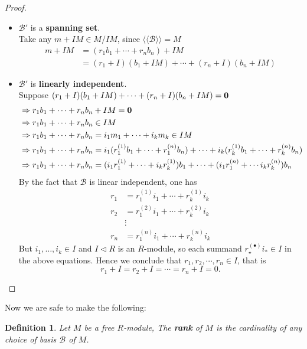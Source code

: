 \documentclass[12pt]{amsbook}
\newtheorem{definition}[theorem]{Definition}
\begin{document}
\begin{proof}
\bigskip
    \begin{itemize}
        \item $\mathcal{B}'$ is a {\bf spanning set}. \\
         Take any $m+IM\in M/IM$, since $\langle\langle\mathcal{B}\rangle\rangle = M$
            \begin{align*}
                m+IM&=(r_1b_1+\cdots+r_nb_n)+IM \\
                    &=(r_1+I)(b_1+IM)+\cdots+(r_n+I)(b_n+IM)
            \end{align*}
        \item $\mathcal{B}'$ is {\bf linearly independent}.\\
         Suppose $(r_1+I)(b_1+IM)+\cdots+(r_n+I)(b_n+IM)= {\bf 0}$
        \begin{align*}
            & \Rightarrow r_1b_1+\cdots+r_nb_n+IM={\bf 0} \\
            & \Rightarrow r_1b_1+\cdots+r_nb_n \in IM \\
            & \Rightarrow r_1b_1+\cdots+r_nb_n=i_1m_1+\cdots+i_km_k\in IM \\
            & \Rightarrow r_1b_1+\cdots+r_nb_n=i_1(r_1^{(1)}b_1+\cdots+r_1^{(n)}b_n)+\cdots +i_k(r_k^{(1)}b_1+\cdots+r_k^{(n)}b_n) \\
            & \Rightarrow r_1b_1+\cdots+r_nb_n=(i_1r_1^{(1)}+\cdots+i_kr_k^{(1)})b_1+\cdots+(i_1r_1^{(n)}+\cdots i_kr_k^{(n)})b_n
        \end{align*}
        By the fact that $\mathcal{B}$ is linear independent, one has
        \begin{align*}
             r_1 &=r_1^{(1)}i_1+\cdots+r_k^{(1)}i_k \\
             r_2 &=r_1^{(2)}i_1+\cdots+r_k^{(2)}i_k \\
             &\vdots \\
             r_n &=r_1^{(n)}i_1+\cdots+r_k^{(n)}i_k 
        \end{align*}
        But $i_1, \dots, i_k \in I$ and $I \lhd R$ is an $R$-module, so each summand $r_{\star}^{(\bullet)}i_{\ast} \in I$ in the above equations. Hence we conclude that $r_1,r_2,\cdots,r_n \in I$, that is 
        $$r_1+I=r_2+I=\cdots=r_n+I=0.$$
    \end{itemize}
\end{proof}

Now we are safe to make the following:
\begin{definition}
    Let $M$ be a free $R$-module, The {\bf rank} of $M$ is the cardinality of any choice of basis $\mathcal{B}$ of $M$.
\end{definition}
\end{document}
